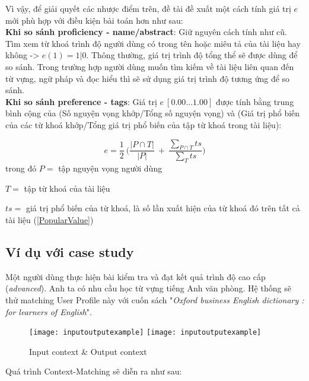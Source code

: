 Vì vậy, để giải quyết các nhược điểm trên, đề tài đề xuất một cách tính giá trị $e$ mới phù hợp với điều kiện bài toán hơn như sau:\\

\textbf{Khi so sánh proficiency - name/abstract}: Giữ nguyên cách tính như cũ. Tìm xem từ khoá trình độ người dùng có trong tên hoặc miêu tả của tài liệu hay không \: -> $e(1) = 1 | 0$. Thông thường, giá trị trình độ tổng thể sẽ được dùng để so sánh. Trong trường hợp người dùng muốn tìm kiếm về tài liệu liên quan đến từ vựng, ngữ pháp và đọc hiểu thì sẽ sử dụng giá trị trình độ tương ứng để so sánh.\\

\textbf{Khi so sánh preference - tags}: Giá trị $e \:[0.00...1.00]$ được tính bằng trung bình cộng của (Số nguyện vọng khớp/Tổng số nguyện vọng) và (Giá trị phổ biến của các từ khoá khớp/Tổng giá trị phổ biến của tập từ khoá trong tài liệu):

\begin{equation}
e = \dfrac{1}{2}\:\Big(\dfrac{|P \cap T|}{|P|}\:+\:\dfrac{\sum\limits_{P \cap T}{ts}}{\sum\limits_{T}{ts}}\Big) 
\end{equation}
trong đó $P = $ tập nguyện vọng người dùng

$T = $ tập từ khoá của tài liệu

$ts = $ giá trị phổ biến của từ khoá, là số lần xuất hiện của từ khoá đó trên tất cả tài liệu (\ref{PopularValue})

\subsection{Ví dụ với case study}

Một người dùng thực hiện bài kiểm tra và đạt kết quả trình độ cao cấp (\textit{advanced}). Anh ta có nhu cầu học từ vựng tiếng Anh văn phòng. Hệ thống sẽ thử matching User Profile này với cuốn sách "\textit{Oxford business English dictionary : for learners of English}".

\begin{figure}[H]
  \begin{center}
    \ifpdf
      \texttt{[image: inputoutputexample]}
    \else
      \texttt{[image: inputoutputexample]}
    \fi
    \caption{Input context \& Output context}
    \label{InputOutputExample}
  \end{center}
\end{figure}

Quá trình Context-Matching sẽ diễn ra như sau:\\

